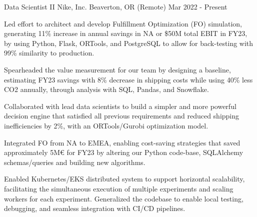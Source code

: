 


\begin{cventries}


\cventry
{Data Scientist II} %
{Nike, Inc.} %
{Beaverton, OR (Remote)} %
{Mar 2022 - Present} %
{ %
\begin{cvitems}
\item {
Led effort to architect and develop Fulfillment Optimization (FO) simulation, generating 11\% increase in annual savings in NA or \$50M total EBIT in FY23, by using Python, Flask, ORTools, and PostgreSQL to allow for back-testing with 99\% similarity to production.
}
\item {
Spearheaded the value measurement for our team by designing a baseline, estimating FY23 savings with 8\% decrease in shipping costs while using 40\% less CO2 annually, through analysis with SQL, Pandas, and Snowflake.
}
\item {
Collaborated with lead data scientists to build a simpler and more powerful decision engine that satisfied all previous requirements and reduced shipping inefficiencies by 2\%, with an ORTools/Gurobi optimization model.
}
\item {
Integrated FO from NA to EMEA, enabling cost-saving strategies that saved approximately 5M€ for FY23 by altering our Python code-base, SQLAlchemy schemas/queries and building new algorithms.
}
\item {
Enabled Kubernetes/EKS distributed system to support horizontal scalability, facilitating the simultaneous execution of multiple experiments and scaling workers for each experiment. Generalized the codebase to enable local testing, debugging, and seamless integration with CI/CD pipelines.
}
\end{cvitems}
}



\end{cventries}
